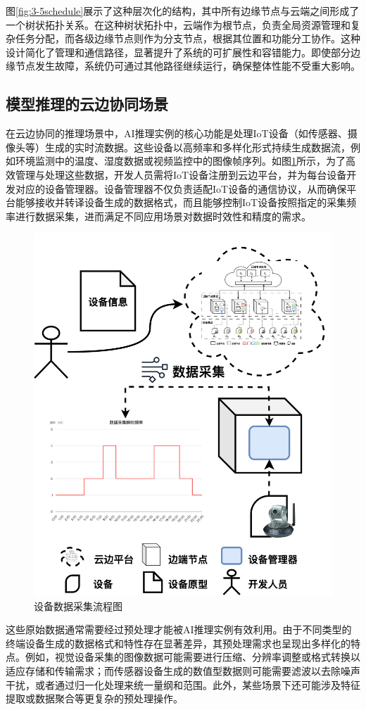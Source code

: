 图\ref{fig:3-5schedule}展示了这种层次化的结构，其中所有边缘节点与云端之间形成了一个树状拓扑关系。在这种树状拓扑中，云端作为根节点，负责全局资源管理和复杂任务分配，而各级边缘节点则作为分支节点，根据其位置和功能分工协作。这种设计简化了管理和通信路径，显著提升了系统的可扩展性和容错能力。即使部分边缘节点发生故障，系统仍可通过其他路径继续运行，确保整体性能不受重大影响。

\subsection{模型推理的云边协同场景}

在云边协同的推理场景中，AI推理实例的核心功能是处理IoT设备（如传感器、摄像头等）生成的实时流数据。这些设备以高频率和多样化形式持续生成数据流，例如环境监测中的温度、湿度数据或视频监控中的图像帧序列。如图\ref{fig:3-3device}所示，为了高效管理与处理这些数据，开发人员需将IoT设备注册到云边平台，并为每台设备开发对应的设备管理器。设备管理器不仅负责适配IoT设备的通信协议，从而确保平台能够接收并转译设备生成的数据格式，而且能够控制IoT设备按照指定的采集频率进行数据采集，进而满足不同应用场景对数据时效性和精度的需求。

\begin{figure}[ht]
  \centering
  \includegraphics[width=0.6\linewidth]{pics/3-3设备模型.png}
  \caption{设备数据采集流程图}
  \label{fig:3-3device}
\end{figure}

这些原始数据通常需要经过预处理才能被AI推理实例有效利用。由于不同类型的终端设备生成的数据格式和特性存在显著差异，其预处理需求也呈现出多样化的特点。例如，视觉设备采集的图像数据可能需要进行压缩、分辨率调整或格式转换以适应存储和传输需求；而传感器设备生成的数值型数据则可能需要滤波以去除噪声干扰，或者通过归一化处理来统一量纲和范围。此外，某些场景下还可能涉及特征提取或数据聚合等更复杂的预处理操作。

